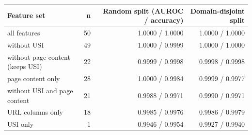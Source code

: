 {\footnotesize
\begin{tabular}{lrrr}
\toprule
\textbf{Feature set} & \textbf{n} & \textbf{Random split (AUROC / accuracy)} & \textbf{Domain-disjoint split} \\
\midrule
all features & 50 & 1.0000 / 1.0000 & 1.0000 / 1.0000 \\
without USI & 49 & 1.0000 / 0.9999 & 1.0000 / 1.0000 \\
without page content (keeps USI) & 22 & 0.9999 / 0.9998 & 0.9998 / 0.9998 \\
page content only & 28 & 1.0000 / 0.9984 & 0.9999 / 0.9977 \\
without USI and page content & 21 & 0.9988 / 0.9971 & 0.9990 / 0.9971 \\
URL columns only & 18 & 0.9985 / 0.9976 & 0.9986 / 0.9979 \\
USI only & 1 & 0.9946 / 0.9954 & 0.9927 / 0.9940 \\
\bottomrule
\end{tabular}
}
